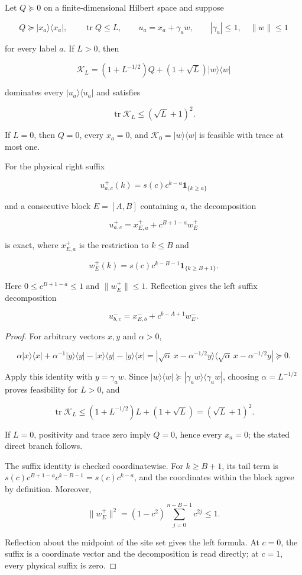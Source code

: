 \begin{lemma}
\label{lem:supp-weighted-block-tail}
Let \(Q\succeq0\) on a finite-dimensional Hilbert space and suppose

\[
 Q\succeq|x_a\rangle\langle x_a|,\qquad
 \operatorname{tr}Q\le L,\qquad
 u_a=x_a+\gamma_aw,
 \qquad |\gamma_a|\le1,\quad\|w\|\le1
\]

for every label \(a\).  If \(L>0\), then

\[
 \mathcal K_L=(1+L^{-1/2})Q+(1+\sqrt L)|w\rangle\langle w|
\]

dominates every \(|u_a\rangle\langle u_a|\) and satisfies

\[
 \operatorname{tr}\mathcal K_L\le(\sqrt L+1)^2.
\]

If \(L=0\), then \(Q=0\), every \(x_a=0\), and
\(\mathcal K_0=|w\rangle\langle w|\) is feasible with trace at most one.

For the physical right suffix

\[
 u^+_{a,c}(k)=s(c)c^{k-a}\mathbf1_{\{k\ge a\}}
\]

and a consecutive block \(E=[A,B]\) containing \(a\), the decomposition

\[
 u^+_{a,c}=x^+_{E,a}+c^{B+1-a}w_E^+
\]

is exact, where \(x^+_{E,a}\) is the restriction to \(k\le B\) and

\[
 w_E^+(k)=s(c)c^{k-B-1}\mathbf1_{\{k\ge B+1\}}.
\]

Here \(0\le c^{B+1-a}\le1\) and \(\|w_E^+\|\le1\).  Reflection gives the
left suffix decomposition

\[
 u^-_{b,c}=x^-_{E,b}+c^{b-A+1}w_E^-.
\]
\end{lemma}

\begin{proof}
For arbitrary vectors \(x,y\) and \(\alpha>0\),

\[
 \alpha|x\rangle\langle x|+\alpha^{-1}|y\rangle\langle y|
 -|x\rangle\langle y|-|y\rangle\langle x|
 =
 |\sqrt\alpha\,x-\alpha^{-1/2}y\rangle
 \langle\sqrt\alpha\,x-\alpha^{-1/2}y|\succeq0.
\]

Apply this identity with \(y=\gamma_aw\).  Since
\(|w\rangle\langle w|\succeq|\gamma_aw\rangle
\langle\gamma_aw|\), choosing \(\alpha=L^{-1/2}\) proves feasibility for
\(L>0\), and

\[
 \operatorname{tr}\mathcal K_L
 \le(1+L^{-1/2})L+(1+\sqrt L)=(\sqrt L+1)^2.
\]

If \(L=0\), positivity and trace zero imply \(Q=0\), hence every \(x_a=0\);
the stated direct branch follows.

The suffix identity is checked coordinatewise.  For \(k\ge B+1\), its tail
term is
\(s(c)c^{B+1-a}c^{k-B-1}=s(c)c^{k-a}\), and the coordinates within the block
agree by definition. Moreover,

\[
 \|w_E^+\|^2=(1-c^2)\sum_{j=0}^{n-B-1}c^{2j}\le1.
\]

Reflection about the midpoint of the site set gives the left formula.  At
\(c=0\), the suffix is a coordinate vector and the decomposition is read
directly; at \(c=1\), every physical suffix is zero.
\end{proof}

